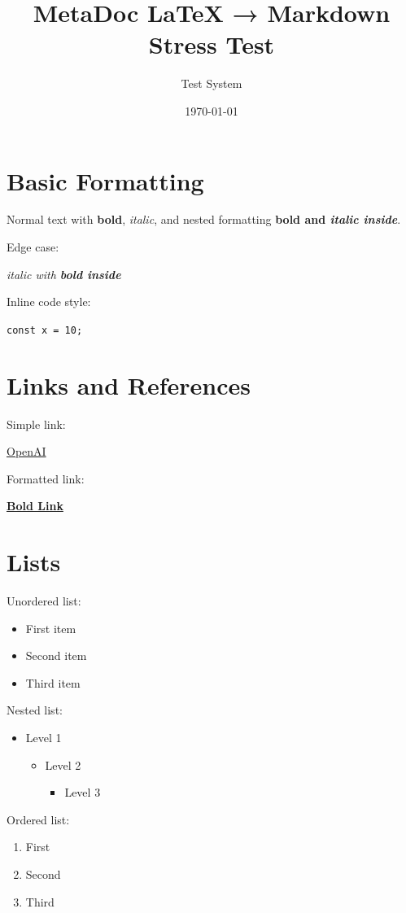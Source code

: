 \documentclass{article}
\title{MetaDoc LaTeX → Markdown Stress Test}
\author{Test System}
\date{\today}
\begin{document}
\maketitle

\section{Basic Formatting}

Normal text with \textbf{bold}, \textit{italic}, and nested formatting
\textbf{bold and \textit{italic inside}}.

Edge case:

\textit{italic with \textbf{bold inside}}

Inline code style:

\texttt{const x = 10;}

\section{Links and References}

Simple link:

\href{https://openai.com}{OpenAI}

Formatted link:

\href{https://example.com}{\textbf{Bold Link}}

\section{Lists}

Unordered list:

\begin{itemize}
\item First item
\item Second item
\item Third item
\end{itemize}

Nested list:

\begin{itemize}
\item Level 1
\begin{itemize}
\item Level 2
\begin{itemize}
\item Level 3
\end{itemize}
\end{itemize}
\end{itemize}

Ordered list:

\begin{enumerate}
\item First
\item Second
\item Third
\end{enumerate}
\end{document}
